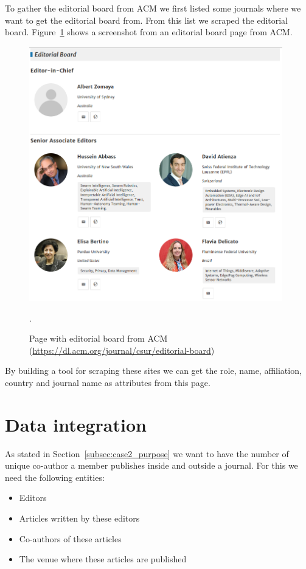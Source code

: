 \documentclass{ou-report}
\begin{document}
To gather the editorial board from ACM we first listed some journals where 
we want to get the editorial board from. From this list we scraped the 
editorial board. Figure~\ref{fig:acm_editorial_board} shows a screenshot 
from an editorial board page from ACM.

\begin{figure}[H]
\centering
\includegraphics[width=11cm]{images/acm_editorial_board.png}
\caption{Page with editorial board from ACM (\url{https://dl.acm.org/journal/csur/editorial-board})}.
\label{fig:acm_editorial_board}
\end{figure}

By building a tool for scraping these sites we can get the role, name, 
affiliation, country and journal name as attributes from this page.

\section{Data integration}
As stated in Section~\ref{subsec:case2_purpose} we want to have the number of
unique co-author a member publishes inside and outside a journal. For this we
need the following entities:
\begin{itemize}
    \item Editors
    \item Articles written by these editors
    \item Co-authors of these articles
    \item The venue where these articles are published
\end{itemize}
\end{document}
